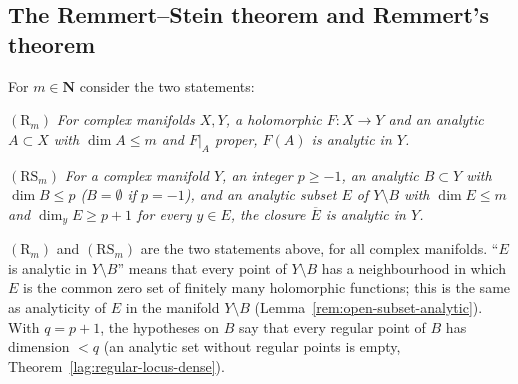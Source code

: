 \subsection{The Remmert--Stein theorem and Remmert's theorem}

For \(m\in\mathbf N\) consider the two statements:

\((\mathrm R_m)\) \emph{For complex manifolds \(X,Y\), a holomorphic \(F\colon X\to Y\) and an analytic \(A\subset X\) with \(\dim A\le m\) and \(F|_A\) proper,
\(F(A)\) is analytic in \(Y\).}

\((\mathrm{RS}_m)\) \emph{For a complex manifold \(Y\), an integer \(p\ge-1\), an analytic \(B\subset Y\) with \(\dim B\le p\) (\(B=\emptyset\) if \(p=-1\)), and an analytic subset \(E\) of \(Y\setminus B\) with
\(\dim E\le m\) and \(\dim_yE\ge p+1\) for every \(y\in E\), the closure \(\overline E\) is analytic in \(Y\).}

\begin{definition}
\label{rem:induction-statements}
\leanok
\((\mathrm R_m)\) and \((\mathrm{RS}_m)\) are the two statements above, for all complex manifolds. ``\(E\) is analytic in \(Y\setminus B\)'' means that every
point of \(Y\setminus B\) has a neighbourhood in which \(E\) is the common zero set of finitely many holomorphic functions; this is the same as
analyticity of \(E\) in the manifold \(Y\setminus B\) (Lemma~\ref{rem:open-subset-analytic}). With \(q=p+1\), the hypotheses on \(B\) say that every
regular point of \(B\) has dimension \(<q\) (an analytic set without regular points is empty, Theorem~\ref{lag:regular-locus-dense}).
\end{definition}

